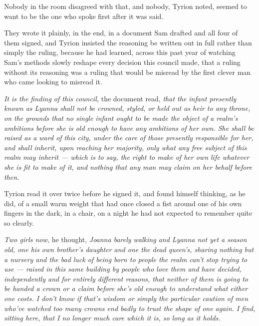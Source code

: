 Nobody in the room disagreed with that, and nobody, Tyrion noted, seemed to want to be the one who spoke first after it was said.

\sceneBreak

They wrote it plainly, in the end, in a document Sam drafted and all four of them signed, and Tyrion insisted the reasoning be written out in full rather than simply the ruling, because he had learned, across this past year of watching Sam’s methods slowly reshape every decision this council made, that a ruling without its reasoning was a ruling that would be misread by the first clever man who came looking to misread it.

\textit{It is the finding of this council,} the document read, \textit{that the infant presently known as Lyanna shall not be crowned, styled, or held out as heir to any throne, on the grounds that no single infant ought to be made the object of a realm’s ambitions before she is old enough to have any ambitions of her own. She shall be raised as a ward of this city, under the care of those presently responsible for her, and shall inherit, upon reaching her majority, only what any free subject of this realm may inherit — which is to say, the right to make of her own life whatever she is fit to make of it, and nothing that any man may claim on her behalf before then.}

Tyrion read it over twice before he signed it, and found himself thinking, as he did, of a small warm weight that had once closed a fist around one of his own fingers in the dark, in a chair, on a night he had not expected to remember quite so clearly.

\textit{Two girls now,} he thought, \textit{Joanna barely walking and Lyanna not yet a season old, one his own brother’s daughter and one the dead queen’s, sharing nothing but a nursery and the bad luck of being born to people the realm can’t stop trying to use — raised in this same building by people who love them and have decided, independently and for entirely different reasons, that neither of them is going to be handed a crown or a claim before she’s old enough to understand what either one costs. I don’t know if that’s wisdom or simply the particular caution of men who’ve watched too many crowns end badly to trust the shape of one again. I find, sitting here, that I no longer much care which it is, so long as it holds.}

\sceneBreak

